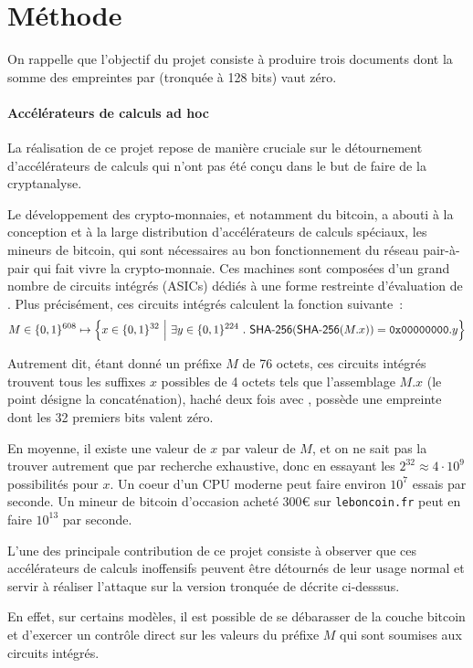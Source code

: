 \documentclass[
    a4paper, 
    12pt, onecolumn,
]{article}
\begin{document}
\section{M\'ethode}

On rappelle que l'objectif du projet consiste à produire trois documents dont la
somme des empreintes par \sha (tronquée à 128 bits) vaut zéro.

\paragraph{Accélérateurs de calculs ad hoc} La réalisation de ce projet repose
de manière cruciale sur le \og détournement\fg{} d'accélérateurs de calculs qui
n'ont pas été conçu dans le but de faire de la cryptanalyse.

Le développement des crypto-monnaies, et notamment du bitcoin, a abouti à la
conception et à la large distribution d'accélérateurs de calculs spéciaux, les
\og mineurs de bitcoin\fg{}, qui sont nécessaires au bon fonctionnement du
réseau pair-à-pair qui fait vivre la crypto-monnaie. Ces machines sont composées
d'un grand nombre de circuits intégrés (ASICs) dédiés à une forme restreinte
d'évaluation de \sha. Plus précisément, ces circuits intégrés calculent la
fonction suivante~:
\[
  M \in \{0, 1\}^{608} \mapsto \Bigl\{ x \in \{0, 1\}^{32}~\Bigl|\Bigr.~ \exists y \in \{0, 1\}^{224}~.~\textsf{SHA-256}(\textsf{SHA-256}(M.x)) = \texttt{0x00000000} . y \Bigr\}
\]

Autrement dit, étant donné un préfixe $M$ de 76 octets, ces circuits intégrés
trouvent tous les suffixes $x$ possibles de 4 octets tels que l'assemblage $M.x$
(le point désigne la concaténation), haché deux fois avec \sha, possède une
empreinte dont les 32 premiers bits valent zéro.

En moyenne, il existe une valeur de $x$ par valeur de $M$, et on ne sait pas la
trouver autrement que par recherche exhaustive, donc en essayant les
$2^{32} \approx 4 \cdot 10^{9}$ possibilités pour $x$. Un coeur d'un CPU moderne
peut faire environ $10^{7}$ essais par seconde. Un mineur de bitcoin d'occasion
acheté 300\euro\xspace sur \texttt{leboncoin.fr} peut en faire $10^{13}$ par seconde.

L'une des principale contribution de ce projet consiste à observer que ces
accélérateurs de calculs \og inoffensifs\fg{} peuvent être détournés de leur
usage normal et servir à réaliser l'attaque sur la version tronquée de \sha
décrite ci-desssus.

En effet, sur certains modèles, il est possible de se débarasser de la couche
\og bitcoin\fg{} et d'exercer un contrôle direct sur les valeurs du préfixe $M$
qui sont soumises aux circuits intégrés.
\end{document}
